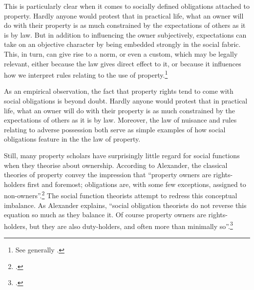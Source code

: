 {This is particularly clear when it comes to socially defined obligations attached to property. Hardly anyone would protest that in practical life, what an owner will do with their property is as much constrained by the expectations of others as it is by law. But in addition to influencing the owner subjectively, expectations can take on an objective character by being embedded strongly in the social fabric. This, in turn, can give rise to a norm, or even a custom, which may be legally relevant, either because the law gives direct effect to it, or because it influences how we interpret rules relating to the use of property.\footnote{See generally \cite{penalver09,alexander09}.}
}

As an empirical observation, the fact that property rights tend to come with social obligations is beyond doubt. Hardly anyone would protest that in practical life, what an owner will do with their property is as much constrained by the expectations of others as it is by law. Moreover, the law of nuisance and rules relating to adverse possession both serve as simple examples of how social obligations feature in the the law of property. 

Still, many property scholars have surprisingly little regard for social functions when they theorise about ownership. According to Alexander, the classical theories of property convey the impression that ``property owners are rights-holders first and foremost; obligations are, with some few exceptions, assigned to non-owners''.\footcite[1023]{alexander11} The social function theorists attempt to redress this conceptual imbalance. As Alexander explains, ``social obligation theorists do not reverse this equation so much as they balance it. Of course property owners are rights-holders, but they are also duty-holders, and often more than minimally so''.\footcite[1023]{alexander11}

